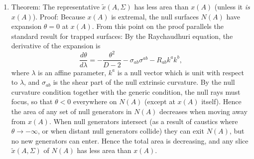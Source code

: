 \documentclass[12pt]{article}
\begin{document}
\begin{enumerate}
\item \label{trap} Theorem: The representative $\tilde{x}(A,\Sigma)$ has less area than $x(A)$ (unless it \emph{is} $x(A)$).  Proof: Because $x(A)$ is extremal, the null surfaces $N(A)$ have expansion $\theta = 0$ at $x(A)$.  From this point on the proof parallels the standard result \cite{HawkingEllis} for trapped surfaces: By the Raychaudhuri equation, the derivative of the expansion is
\begin{equation}\label{Ray}
\frac{d\theta}{d\lambda} = -\frac{\theta^2}{D-2} - \sigma_{ab}\sigma^{ab} - R_{ab} k^a k^b,
\end{equation}
where $\lambda$ is an affine parameter, $k^a$ is a null vector which is unit with respect to $\lambda$, and $\sigma_{ab}$ is the shear part of the null extrinsic curvature.  By the null curvature condition together with the generic condition, the null rays must focus, so that $\theta < 0$ everywhere on $N(A)$ (except at $x(A)$ itself).  Hence the area of any set of null generators in $N(A)$ decreases when moving away from $x(A)$.  When null generators intersect (as a result of caustics where $\theta \to -\infty$, or when distant null generators collide) they can exit $N(A)$, but no new generators can enter.  Hence the total area is decreasing, and any slice $\tilde{x}(A,\Sigma)$ of $N(A)$ has less area than $x(A)$.


\end{enumerate}
\end{document}
